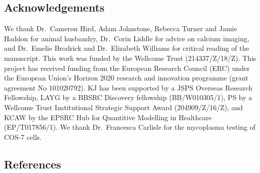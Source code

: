 \documentclass[
  10pt,
  onecolumn]{article}
\begin{document}
\hypertarget{acknowledgements}{%
\subsection{Acknowledgements}\label{acknowledgements}}

We thank Dr.~Cameron Hird, Adam Johnstone, Rebecca Turner and Jamie
Haddon for animal husbandry, Dr.~Corin Liddle for advice on calcium
imaging, and Dr.~Emelie Brodrick and Dr.~Elizabeth Williams for critical
reading of the manuscript. This work was funded by the Wellcome Trust
(214337/Z/18/Z). This project has received funding from the European
Research Council (ERC) under the European Union's Horizon 2020 research
and innovation programme (grant agreement No 101020792). KJ has been
supported by a JSPS Overseas Research Fellowship, LAYG by a BBSRC
Discovery fellowship (BB/W010305/1), PS by a Wellcome Trust
Institutional Strategic Support Award (204909/Z/16/Z), and KCAW by the
EPSRC Hub for Quantitive Modelling in Healthcare (EP/T017856/1). We
thank Dr.~Francesca Carlisle for the mycoplasma testing of COS-7 cells.

\hypertarget{references}{%
\subsection*{References}\label{references}}
\end{document}
